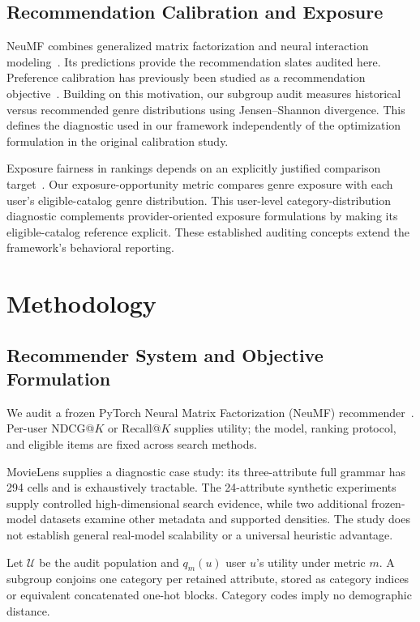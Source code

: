 \documentclass[sigconf,nonacm]{acmart}
\begin{document}
\subsection{Recommendation Calibration and Exposure}
NeuMF combines generalized matrix factorization and neural interaction modeling~\cite{he2017ncf}. Its predictions provide the recommendation slates audited here. Preference calibration has previously been studied as a recommendation objective~\cite{steck2018calibration}. Building on this motivation, our subgroup audit measures historical versus recommended genre distributions using Jensen--Shannon divergence. This defines the diagnostic used in our framework independently of the optimization formulation in the original calibration study.

Exposure fairness in rankings depends on an explicitly justified comparison target~\cite{singh2018fairness}. Our exposure-opportunity metric compares genre exposure with each user's eligible-catalog genre distribution. This user-level category-distribution diagnostic complements provider-oriented exposure formulations by making its eligible-catalog reference explicit. These established auditing concepts extend the framework's behavioral reporting.


\section{Methodology}
\label{sec:methodology}

\subsection{Recommender System and Objective Formulation}
We audit a frozen PyTorch Neural Matrix Factorization (NeuMF) recommender~\cite{he2017ncf}. Per-user NDCG@$K$ or Recall@$K$ supplies utility; the model, ranking protocol, and eligible items are fixed across search methods.

MovieLens supplies a diagnostic case study: its three-attribute full grammar has 294 cells and is exhaustively tractable. The 24-attribute synthetic experiments supply controlled high-dimensional search evidence, while two additional frozen-model datasets examine other metadata and supported densities. The study does not establish general real-model scalability or a universal heuristic advantage.

Let $\mathcal{U}$ be the audit population and $q_m(u)$ user $u$'s utility under metric $m$. A subgroup conjoins one category per retained attribute, stored as category indices or equivalent concatenated one-hot blocks. Category codes imply no demographic distance.
\end{document}
